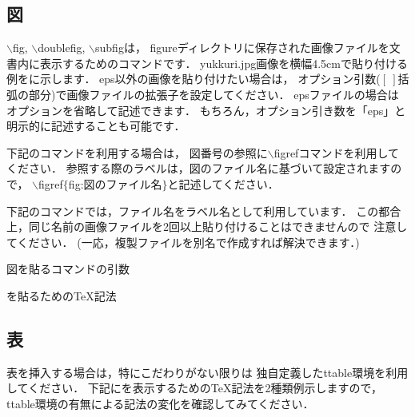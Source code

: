 \subsection{図}
$\backslash$fig, $\backslash$doublefig, $\backslash$subfigは，
figureディレクトリに保存された画像ファイルを文書内に表示するためのコマンドです．
yukkuri.jpg画像を横幅4.5cmで貼り付ける例をに示します．
eps以外の画像を貼り付けたい場合は，
オプション引数($[\ ]$括弧の部分)で画像ファイルの拡張子を設定してください．
epsファイルの場合はオプションを省略して記述できます．
もちろん，オプション引き数を「eps」と明示的に記述することも可能です．

下記のコマンドを利用する場合は，
図番号の参照に$\backslash$figrefコマンドを利用してください．
参照する際のラベルは，図のファイル名に基づいて設定されますので，
$\backslash$figref$\{$fig:図のファイル名$\}$と記述してください．

下記のコマンドでは，ファイル名をラベル名として利用しています．
この都合上，同じ名前の画像ファイルを2回以上貼り付けることはできませんので
注意してください．
(一応，複製ファイルを別名で作成すれば解決できます．)
%
\begin{lstbox}{図を貼るコマンドの引数}
\begin{minilst}
\end{minilst}
\end{lstbox}
%
%
\begin{lstbox}{を貼るためのTeX記法}
\begin{minilst}
\end{minilst}
\end{lstbox}

\subsection{表}
表を挿入する場合は，特にこだわりがない限りは
独自定義したttable環境を利用してください．
下記にを表示するためのTeX記法を2種類例示しますので，
ttable環境の有無による記法の変化を確認してみてください．

